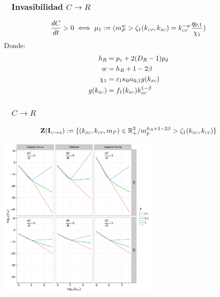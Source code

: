 \documentclass[11 pt,t]{beamer}
\newcommand{\CC}{\textit{\tiny C}}
\newcommand{\R}{\textit{\tiny R}}
\newcommand{\CP}{\textit{\tiny CP}}
\newcommand{\RC}{\textit{\tiny RC}}
\begin{document}
\begin{frame}
  \frametitle{\resizebox{0.3in}{0.3in}{} $\;\;$ Invasibilidad $C \to R$}
  \begin{equation}
    \frac{dC}{dt} > 0 \iff  \mu_1 := (m_P^w > \zeta_1(k_{\CP},k_{\RC}) = k^{-w}_{\CP} \frac{q_{0,1}}{\chi_1})
  \end{equation}
  Donde:
  \begin{equation}
    \begin{aligned}
      h_R &= p_v + 2(D_R - 1)p_d \\
      w &= h_R + 1 - 2 \beta \\
      \chi_1 &= \varepsilon_1 \kappa_0\alpha_{0,1} g(k_{\RC}) \\
      g(k_{\RC}) &= f_1(k_{\RC})k_{\RC}^{1-\beta}\\
    \end{aligned}
  \end{equation}
\end{frame}
\begin{frame}
  \frametitle{\resizebox{0.3in}{0.3in}{} $\;\;$ $C \to R$}
  \begin{equation}
\mathbf{Z(I_{\CC \to \R})} := \{ (k_{\RC},k_{\CP},m_P) \in \mathbb{R}^3_+ / m_p^{h_R + 1 - 2\beta} > \zeta_1(k_{\RC},k_{\CP}) \}
\end{equation}

\centering
\includegraphics[width = 0.6\textwidth]{../manuscript/Plots/R-CInv.pdf}

\end{frame}
\end{document}
